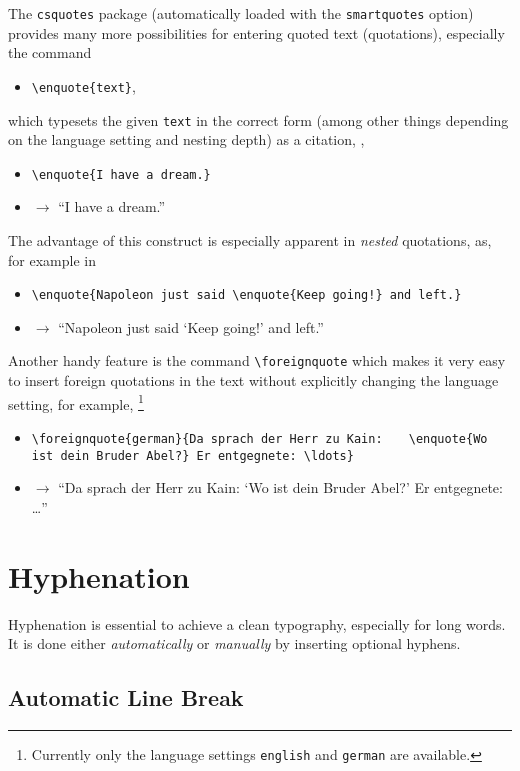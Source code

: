 The \texttt{csquotes} package (automatically loaded with the
\texttt{smartquotes} option) provides many more possibilities for entering
quoted text (quotations), especially the command
%
\begin{itemize}
    \item[] \verb!\enquote{text}!,
\end{itemize}
%
which typesets the given \texttt{text} in the correct form (among other things
depending on the language setting and nesting depth) as a citation, \eg,
%
\begin{itemize}
    \item[] \verb|\enquote{I have a dream.}|
    \item[] $\rightarrow$ \enquote{I have a dream.}
\end{itemize}
%
The advantage of this construct is especially apparent in \emph{nested}
quotations, as, for example in
%
\begin{itemize}
    \item[] \verb|\enquote{Napoleon just said \enquote{Keep going!} and left.}|
    \item[] $\rightarrow$ \enquote{Napoleon just said \enquote{Keep going!} and
    left.}
\end{itemize}
%
Another handy feature is the command \verb!\foreignquote! which makes it very
easy to insert foreign quotations in the text without explicitly changing the
language setting, for example,%
\footnote{Currently only the language settings \texttt{english} and
\texttt{german} are available.}
%
\begin{itemize}
    \item[] \verb|\foreignquote{german}{Da sprach der Herr zu Kain:|\newline
    \verb|   \enquote{Wo ist dein Bruder Abel?} Er entgegnete: \ldots}|
    \item[] $\rightarrow$ \foreignquote{german}{Da sprach der Herr zu Kain:
    \enquote{Wo ist dein Bruder Abel?}  Er entgegnete: \ldots}
\end{itemize}


\section{Hyphenation}
\label{subsec:hyphenation}

Hyphenation is essential to achieve a clean typography, especially for long words.
It is done either \emph{automatically} or \emph{manually} by inserting optional
hyphens.

\subsection{Automatic Line Break}

